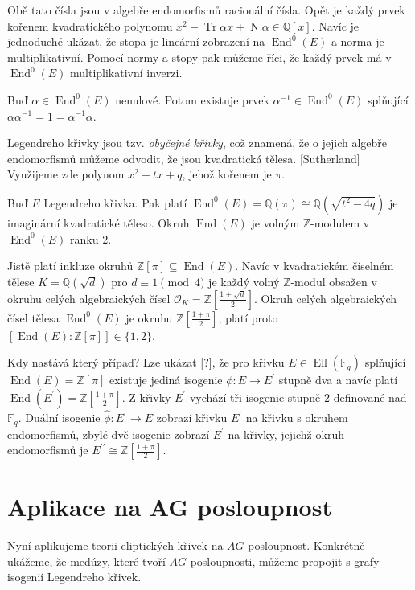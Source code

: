 \documentclass[12pt]{report}
\DeclareMathOperator{\Tr}{Tr}
\DeclareMathOperator{\N}{N}
\DeclareMathOperator{\End}{End}
\DeclareMathOperator{\Ell}{Ell}
\begin{document}
Obě tato čísla jsou v algebře endomorfismů racionální čísla. Opět je každý prvek kořenem kvadratického polynomu $x^2 - \Tr \alpha x + \N \alpha \in \mathbb{Q}[x]$. Navíc je jednoduché ukázat, že stopa je lineární zobrazení na $\End^0 (E)$ a norma je multiplikativní. Pomocí normy a stopy pak můžeme říci, že každý prvek má v $\End^0 (E)$ multiplikativní inverzi. 
\begin{veta}
Buď $\alpha \in \End^0 (E)$ nenulové. Potom existuje prvek $\alpha^{-1} \in \End^0 (E)$ splňující $\alpha \alpha^{-1} = 1 = \alpha^{-1} \alpha$. 
\end{veta}
Legendreho křivky jsou tzv. \textit{obyčejné křivky}, což znamená, že o jejich algebře endomorfismů můžeme odvodit, že jsou kvadratická tělesa. [Sutherland] Využijeme zde polynom $x^2-tx+q$, jehož kořenem je $\pi$.
\begin{dusledek}
Buď $E$ Legendreho křivka. Pak platí $\End^0(E) = \mathbb{Q}(\pi) \cong \mathbb{Q}(\sqrt{t^2-4q})$ je imaginární kvadratické těleso. Okruh $\End (E)$ je volným $\mathbb{Z}$-modulem v $\End^0 (E)$ ranku $2$.
\end{dusledek}
Jistě platí inkluze okruhů $\mathbb{Z}[\pi] \subseteq \End(E)$. Navíc v kvadratickém číselném tělese $K = \mathbb{Q}(\sqrt{d})$ pro $d \equiv 1 \pmod{4}$ je každý volný $\mathbb{Z}$-modul obsažen v okruhu celých algebraických čísel $\mathcal{O}_K = \mathbb{Z}\left[\frac{1+\sqrt{d}}{2}\right]$. Okruh celých algebraických čísel tělesa $\End^0 (E)$ je okruhu $\mathbb{Z}\left[\frac{1+\pi}{2}\right]$, platí proto $[\End(E):\mathbb{Z}[\pi]] \in \lbrace 1,2 \rbrace$.
 
Kdy nastává který případ? Lze ukázat [?], že pro křivku $E \in \Ell(\mathbb{F}_q)$ splňující $\End(E) = \mathbb{Z}[\pi]$ existuje jediná isogenie $\phi : E \longrightarrow E^{\prime}$ stupně dva a navíc platí $\End(E^{\prime}) = \mathbb{Z}\left[\frac{1+\pi}{2}\right]$. Z křivky $E^{\prime}$ vychází tři isogenie stupně $2$ definované nad $\mathbb{F}_q$. Duální isogenie $\widehat{\phi} : E^{\prime} \longrightarrow E$ zobrazí křivku $E^{\prime}$ na křivku s  okruhem endomorfismů, zbylé dvě isogenie zobrazí $E^{\prime}$ na křivky, jejichž okruh endomorfismů je $E^{\prime \prime} \cong  \mathbb{Z}\left[\frac{1+\pi}{2}\right]$.


\section{Aplikace na AG posloupnost}

Nyní aplikujeme teorii eliptických křivek na $AG$ posloupnost. Konkrétně ukážeme, že medúzy, které tvoří $AG$ posloupnosti, můžeme propojit s grafy isogenií Legendreho křivek.
\end{document}
